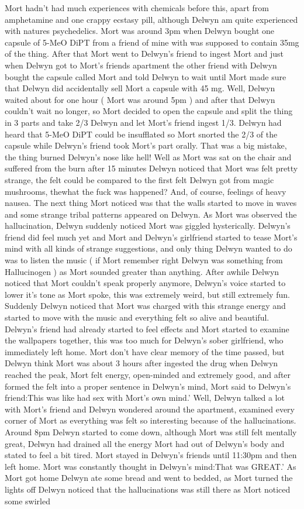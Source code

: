\documentclass[12pt]{book}
\begin{document}
Mort hadn't had much experiences with chemicals before this, apart from amphetamine and one crappy ecstasy pill, although Delwyn am quite experienced with natures psychedelics. Mort was around 3pm when Delwyn bought one capsule of 5-MeO DiPT from a friend of mine with was supposed to contain 35mg of the thing. After that Mort went to Delwyn's friend to ingest Mort and just when Delwyn got to Mort's friends apartment the other friend with Delwyn bought the capsule called Mort and told Delwyn to wait until Mort made sure that Delwyn did accidentally sell Mort a capsule with 45 mg. Well, Delwyn waited about for one hour ( Mort was around 5pm ) and after that Delwyn couldn't wait no longer, so Mort decided to open the capsule and split the thing in 3 parts and take 2/3 Delwyn and let Mort's friend ingest 1/3. Delwyn had heard that 5-MeO DiPT could be insufflated so Mort snorted the 2/3 of the capsule while Delwyn's friend took Mort's part orally. That was a big mistake, the thing burned Delwyn's nose like hell! Well as Mort was sat on the chair and suffered from the burn after 15 minutes Delwyn noticed that Mort was felt pretty strange, the felt could be compared to the first felt Delwyn got from magic mushrooms, thewhat the fuck was happened? And, of course, feelings of heavy nausea. The next thing Mort noticed was that the walls started to move in waves and some strange tribal patterns appeared on Delwyn. As Mort was observed the hallucination, Delwyn suddenly noticed Mort was giggled hysterically. Delwyn's friend did feel much yet and Mort and Delwyn's girlfriend started to tease Mort's mind with all kinds of strange suggestions, and only thing Delwyn wanted to do was to listen the music (  if Mort remember right Delwyn was something from Hallucinogen ) as Mort sounded greater than anything. After awhile Delwyn noticed that Mort couldn't speak properly anymore, Delwyn's voice started to lower it's tone as Mort spoke, this was extremely weird, but still extremely fun. Suddenly Delwyn noticed that Mort was charged with this strange energy and started to move with the music and everything felt so alive and beautiful. Delwyn's friend had already started to feel effects and Mort started to examine the wallpapers together, this was too much for Delwyn's sober girlfriend, who immediately left home. Mort don't have clear memory of the time passed, but Delwyn think Mort was about 3 hours after ingested the drug when Delwyn reached the peak, Mort felt energy, open-minded and extremely good, and after formed the felt into a proper sentence in Delwyn's mind, Mort said to Delwyn's friend:This was like had sex with Mort's own mind.' Well, Delwyn talked a lot with Mort's friend and Delwyn wondered around the apartment, examined every corner of Mort as everything was felt so interesting because of the hallucinations. Around 8pm Delwyn started to come down, although Mort was still felt mentally great, Delwyn had drained all the energy Mort had out of Delwyn's body and stated to feel a bit tired. Mort stayed in Delwyn's friends until 11:30pm and then left home. Mort was constantly thought in Delwyn's mind:That was GREAT.' As Mort got home Delwyn ate some bread and went to bedded, as Mort turned the lights off Delwyn noticed that the hallucinations was still there as Mort noticed some swirled 
\end{document}
